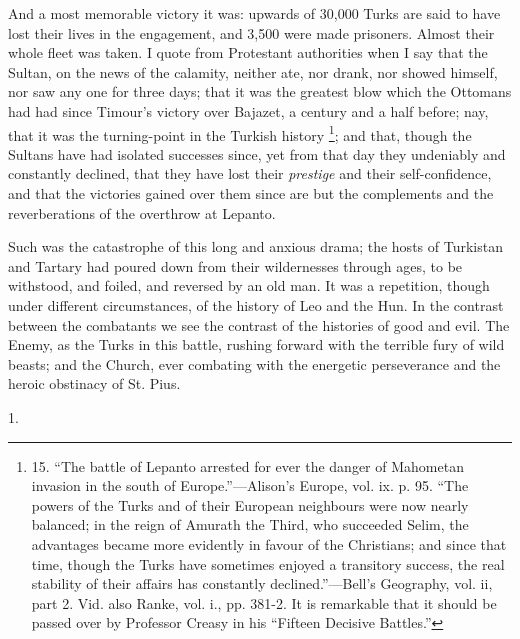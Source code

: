 And a most memorable victory
it was: upwards of 30,000 Turks are said to have lost their lives in
the engagement, and 3,500 were made prisoners. Almost their whole
fleet was taken. I quote from Protestant authorities when I say that
the Sultan, on the news of the calamity, neither ate, nor drank, nor
showed himself, nor saw any one for three days; that it was the
greatest blow which the Ottomans had had since Timour's victory over
Bajazet, a century and a half before; nay, that it was the
turning-point in the Turkish history \footnote{15.
``The battle of Lepanto arrested for ever the danger of Mahometan
invasion in the south of Europe.''—Alison's Europe, vol. ix. p. 95. ``The
powers of the Turks and of their European neighbours were now nearly
balanced; in the reign of Amurath the Third, who succeeded Selim, the
advantages became more evidently in favour of the Christians; and
since that time, though the Turks have sometimes enjoyed a transitory
success, the real stability of their affairs has constantly declined.''—Bell's
Geography, vol. ii, part 2. Vid. also Ranke, vol. i., pp. 381-2. It is
remarkable that it should be passed over by Professor Creasy in his ``Fifteen
Decisive Battles.''}; and that, though the Sultans have had isolated successes
since, yet from that day they undeniably and constantly declined, that
they have lost their \emph{prestige} and their self-confidence, and that the victories gained over them since are but the complements
and the reverberations of the overthrow at Lepanto.

Such was the catastrophe of
this long and anxious drama; the hosts of Turkistan and Tartary had
poured down from their wildernesses through ages, to be withstood, and
foiled, and reversed by an old man. It was a repetition, though under
different circumstances, of the history of Leo and the Hun. In the
contrast between the combatants we see the contrast of the histories
of good and evil. The Enemy, as the Turks in this battle, rushing
forward with the terrible fury of wild beasts; and the Church, ever
combating with the energetic perseverance and the heroic obstinacy of
St. Pius.



1.


